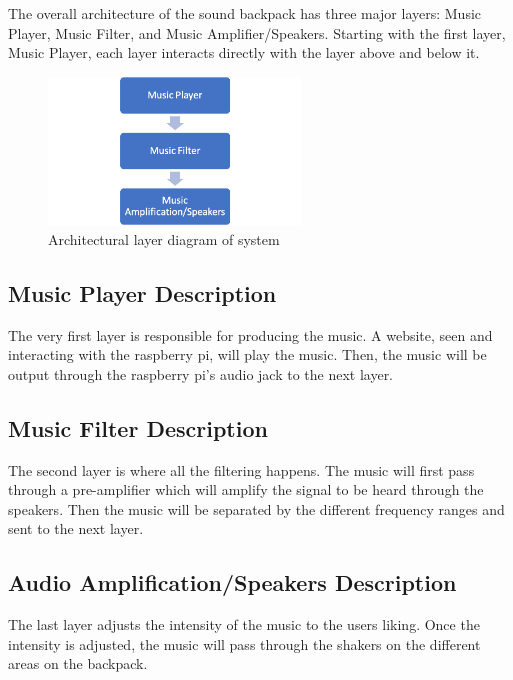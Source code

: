 The overall architecture of the sound backpack has three major layers: Music Player, Music Filter, and Music Amplifier/Speakers. Starting with the first layer, Music Player, each layer interacts directly with the layer above and below it.
\begin{figure}[h!]
	\centering
 	\includegraphics[width=0.60\textwidth]{images/layers}
 \caption{Architectural layer diagram of system}
\end{figure}

\subsection{Music Player Description}
The very first layer is responsible for producing the music. A website, seen and interacting with the raspberry pi, will play the music. Then, the music will be output through the raspberry pi's audio jack to the next layer. 

\subsection{Music Filter Description}
The second layer is where all the filtering happens. The music will first pass through a pre-amplifier which will amplify the signal to be heard through the speakers. Then the music will be separated by the different frequency ranges and sent to the next layer. 

\subsection{Audio Amplification/Speakers Description}
The last layer adjusts the intensity of the music to the users liking. Once the intensity is adjusted, the music will pass through the shakers on the different areas on the backpack. 